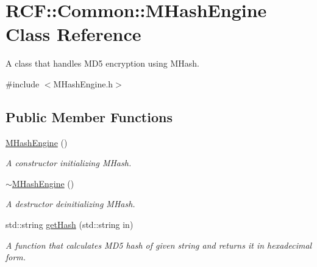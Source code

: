 \hypertarget{class_r_c_f_1_1_common_1_1_m_hash_engine}{}\section{R\+C\+F\+:\+:Common\+:\+:M\+Hash\+Engine Class Reference}
\label{class_r_c_f_1_1_common_1_1_m_hash_engine}


A class that handles M\+D5 encryption using M\+Hash.  




{\ttfamily \#include $<$M\+Hash\+Engine.\+h$>$}

\subsection*{Public Member Functions}
\begin{DoxyCompactItemize}
\item 
\hypertarget{class_r_c_f_1_1_common_1_1_m_hash_engine_a47bfc0f8bea510d18d77a3fcbbc02af2}{}\hyperlink{class_r_c_f_1_1_common_1_1_m_hash_engine_a47bfc0f8bea510d18d77a3fcbbc02af2}{M\+Hash\+Engine} ()\label{class_r_c_f_1_1_common_1_1_m_hash_engine_a47bfc0f8bea510d18d77a3fcbbc02af2}

\begin{DoxyCompactList}\small\item\em A constructor initializing M\+Hash. \end{DoxyCompactList}\item 
\hypertarget{class_r_c_f_1_1_common_1_1_m_hash_engine_a38ee073d45a4fc0b70c357964cbf21ff}{}\hyperlink{class_r_c_f_1_1_common_1_1_m_hash_engine_a38ee073d45a4fc0b70c357964cbf21ff}{$\sim$\+M\+Hash\+Engine} ()\label{class_r_c_f_1_1_common_1_1_m_hash_engine_a38ee073d45a4fc0b70c357964cbf21ff}

\begin{DoxyCompactList}\small\item\em A destructor deinitializing M\+Hash. \end{DoxyCompactList}\item 
std\+::string \hyperlink{class_r_c_f_1_1_common_1_1_m_hash_engine_ab2a535745b7b571b156da3b92b8f9346}{get\+Hash} (std\+::string in)
\begin{DoxyCompactList}\small\item\em A function that calculates M\+D5 hash of given string and returns it in hexadecimal form. \end{DoxyCompactList}\end{DoxyCompactItemize}


